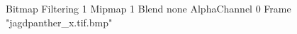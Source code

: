 {Bitmap
	{Filtering 1}
	{Mipmap 1}
	{Blend none}
	{AlphaChannel 0}
	{Frame "jagdpanther_x.tif.bmp"}
}
